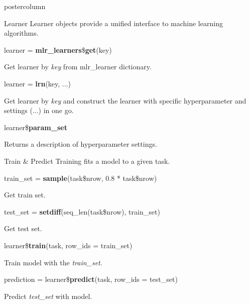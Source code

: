 \documentclass{beamer}
\newlength{\columnheight} %
\begin{document}
\begin{frame}[fragile]{}
\begin{columns}
\begin{column}{.245\textwidth}
			\begin{beamercolorbox}[center]{postercolumn}
				\begin{minipage}{.98\textwidth}
					\parbox[t][\columnheight]{\textwidth}{
						\begin{myblock}{Learner}
							Learner objects provide a unified interface to machine learning algorithms.
							\\
							\begin{codebox}
								learner = \textbf{mlr\_learners}\$\textbf{get}(key)
							\end{codebox}
							Get learner by \textit{key} from mlr\_learner dictionary.
							\\
							\begin{codebox}
								learner = \textbf{lrn}(key, ...)
							\end{codebox}
							Get learner by \textit{key} and construct the learner with specific hyperparameter and settings (...) in one go.
							\\
							\begin{codebox}
								learner\$\textbf{param\_set}
							\end{codebox}
							Returns a description of hyperparameter settings.
						\end{myblock}
						\begin{myblock}{Train \& Predict}
							Training fits a model to a given task.
							\\
							\begin{codebox}
								train\_set = \textbf{sample}(task\$nrow, 0.8 * task\$nrow)
							\end{codebox}
							Get train set.
							\\
							\begin{codebox}
								test\_set = \textbf{setdiff}(seq\_len(task\$nrow), train\_set)
							\end{codebox}
							Get test set.
							\\
							\begin{codebox}
								learner\$\textbf{train}(task, row\_ids = train\_set)
							\end{codebox}
							Train model with the \textit{train\_set}.
							\\
							\begin{codebox}
								prediction = learner\$\textbf{predict}(task, row\_ids = test\_set)
							\end{codebox}
							Predict \textit{test\_set} with model.
							\\

\end{myblock}}
\end{minipage}
\end{beamercolorbox}
\end{column}
\end{columns}
\end{frame}
\end{document}
